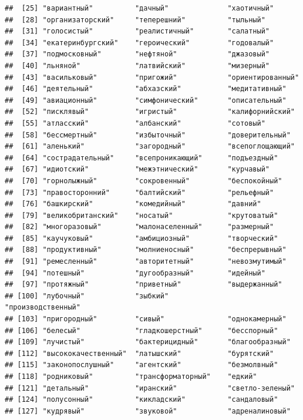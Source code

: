\documentclass[11pt]{article}\usepackage[]{graphicx}\usepackage[]{color}
\makeatletter
\newenvironment{kframe}{%
 \def\at@end@of@kframe{}%
 \ifinner\ifhmode%
  \def\at@end@of@kframe{\end{minipage}}%
  \begin{minipage}{\columnwidth}%
 \fi\fi%
 \def\FrameCommand##1{\hskip\@totalleftmargin \hskip-\fboxsep
 \colorbox{shadecolor}{##1}\hskip-\fboxsep
     \hskip-\linewidth \hskip-\@totalleftmargin \hskip\columnwidth}%
 \MakeFramed {\advance\hsize-\width
   \@totalleftmargin\z@ \linewidth\hsize
   \@setminipage}}%
 {\par\unskip\endMakeFramed%
 \at@end@of@kframe}
\newenvironment{knitrout}{}{} %
\makeatother
\begin{document}
\begin{knitrout}
\begin{kframe}
\begin{verbatim}
##  [25] "вариантный"          "дачный"              "хаотичный"          
##  [28] "организаторский"     "теперешний"          "тыльный"            
##  [31] "голосистый"          "реалистичный"        "салатный"           
##  [34] "екатеринбургский"    "героический"         "годовалый"          
##  [37] "подмосковный"        "нефтяной"            "джазовый"           
##  [40] "льняной"             "латвийский"          "мизерный"           
##  [43] "васильковый"         "пригожий"            "ориентированный"    
##  [46] "деятельный"          "абхазский"           "медитативный"       
##  [49] "авиационный"         "симфонический"       "описательный"       
##  [52] "писклявый"           "игристый"            "калифорнийский"     
##  [55] "атласский"           "албанский"           "сотовый"            
##  [58] "бессмертный"         "избыточный"          "доверительный"      
##  [61] "аленький"            "загородный"          "всепоглощающий"     
##  [64] "сострадательный"     "всепроникающий"      "подъездный"         
##  [67] "идиотский"           "межэтнический"       "курчавый"           
##  [70] "горнолыжный"         "сокровенный"         "беспокойный"        
##  [73] "правосторонний"      "балтийский"          "рельефный"          
##  [76] "башкирский"          "комедийный"          "давний"             
##  [79] "великобританский"    "носатый"             "крутоватый"         
##  [82] "многоразовый"        "малонаселенный"      "размерный"          
##  [85] "каучуковый"          "амбициозный"         "творческий"         
##  [88] "продуктивный"        "молниеносный"        "беспрерывный"       
##  [91] "ремесленный"         "авторитетный"        "невозмутимый"       
##  [94] "потешный"            "дугообразный"        "идейный"            
##  [97] "протяжный"           "приветный"           "выдержанный"        
## [100] "лубочный"            "зыбкий"              "производственный"   
## [103] "пригородный"         "сивый"               "однокамерный"       
## [106] "белесый"             "гладкошерстный"      "бесспорный"         
## [109] "лучистый"            "бактерицидный"       "благообразный"      
## [112] "высококачественный"  "латышский"           "бурятский"          
## [115] "законопослушный"     "агентский"           "безмолвный"         
## [118] "родниковый"          "трансформаторный"    "едкий"              
## [121] "детальный"           "иранский"            "светло-зеленый"     
## [124] "полусонный"          "кикладский"          "сандаловый"         
## [127] "кудрявый"            "звуковой"            "адреналиновый"      

\end{verbatim}
\end{kframe}
\end{knitrout}
\end{document}
